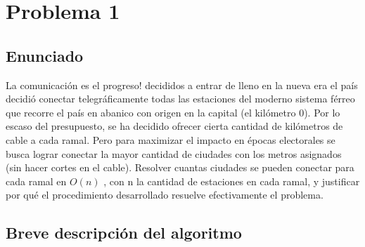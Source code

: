 \documentclass{article}
\theoremstyle{definition}
\theoremstyle{remark}
\begin{document}
{} %

\subtitulo{}
\grupo{}

 
\maketitle

\pagebreak

\tableofcontents

\pagebreak

\section{Problema 1}

\subsection{Enunciado}
La comunicación es el progreso! decididos a entrar de lleno en la nueva era el país decidió conectar telegráficamente todas las estaciones del moderno sistema férreo que recorre el país en abanico con origen en la capital (el kilómetro 0). Por lo escaso del presupuesto, se ha decidido ofrecer cierta cantidad de kilómetros de cable a cada ramal. Pero para maximizar el impacto en épocas electorales se busca lograr conectar la mayor cantidad de ciudades con los metros asignados (sin hacer cortes en el cable).
Resolver cuantas ciudades se pueden conectar para cada ramal en $O(n)$ , con n la cantidad de estaciones en cada ramal, y justificar por qué el procedimiento desarrollado resuelve efectivamente el problema.

\subsection{Breve descripción del algoritmo}
\end{document}
